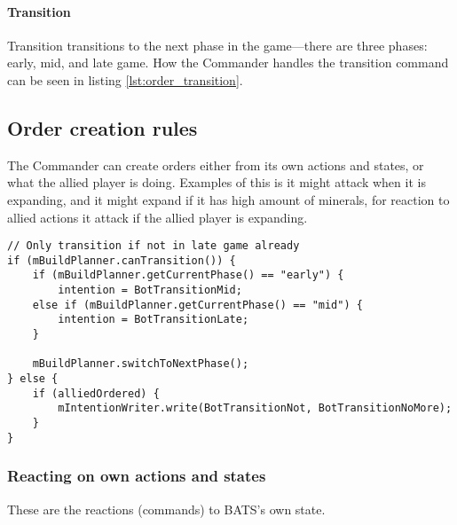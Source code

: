\paragraph{Transition}
Transition transitions to the next phase in the game—there are three phases: early, mid, and late
game. How the Commander handles the transition command can be seen in listing
\ref{lst:order_transition}.

\subsection{Order creation rules}
The Commander can create orders either from its own actions and states, or what the allied player is doing. Examples of this is it might attack when it is expanding, and it might expand if it has high amount of minerals, for reaction to allied actions it attack if the allied player is expanding.
\begin{lstlisting}[label={lst:order_transition},caption={Pseudo-code for transition command}]
// Only transition if not in late game already
if (mBuildPlanner.canTransition()) {
	if (mBuildPlanner.getCurrentPhase() == "early") {
		intention = BotTransitionMid;
	else if (mBuildPlanner.getCurrentPhase() == "mid") {
		intention = BotTransitionLate;
	}

	mBuildPlanner.switchToNextPhase();
} else {
	if (alliedOrdered) {
		mIntentionWriter.write(BotTransitionNot, BotTransitionNoMore);
	}
}
\end{lstlisting}

\subsubsection{Reacting on own actions and states}
These are the reactions (commands) to BATS's own state.

